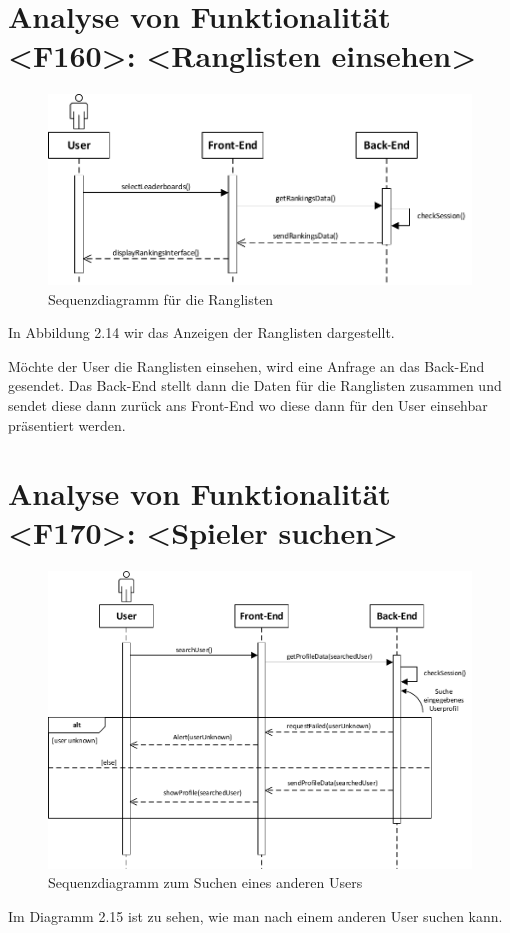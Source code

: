 \section{Analyse von Funktionalität <F160>: <Ranglisten einsehen>}
\begin{figure}[h]
\centering
\includegraphics[width=1.2\textwidth]{figures/sequenz_F160.pdf}
\caption{Sequenzdiagramm für die Ranglisten}
\label{sequence}
\end{figure}
In Abbildung 2.14 wir das Anzeigen der Ranglisten dargestellt.

Möchte der User die Ranglisten einsehen, wird eine Anfrage an das Back-End gesendet. Das Back-End stellt dann die Daten für die Ranglisten zusammen und sendet diese dann zurück ans Front-End wo diese dann für den User einsehbar präsentiert werden.

\newpage
\section{Analyse von Funktionalität <F170>: <Spieler suchen>}
\begin{figure}[h]
\centering
\includegraphics[width=1.3\textwidth]{figures/sequenz_F170.pdf}
\caption{Sequenzdiagramm zum Suchen eines anderen Users}
\label{sequence}
\end{figure}
Im Diagramm 2.15 ist zu sehen, wie man nach einem anderen User suchen kann.

